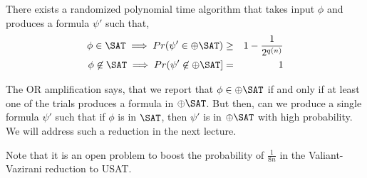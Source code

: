 \begin{lemma}
There exists a randomized polynomial time algorithm that takes input $\phi$ and produces a formula $\psi'$ such that,
\begin{eqnarray*}
\phi \in \SAT \implies Pr(\psi' \in \oplus\SAT) & \geq & 1-\frac{1}{2^{q(n)}} \\
\phi \not\in \SAT \implies Pr (\psi' \not\in \oplus\SAT] & = & 1
\end{eqnarray*}
\end{lemma}

The OR amplification says, that we report that $\phi \in \oplus\SAT$ if and only if at least one of the trials produces a formula in $\oplus\SAT$. But then, can we produce a single formula $\psi'$ such that if $\phi$ is in $\SAT$, then $\psi'$ is in $\oplus\SAT$ with high probability. We will address such a reduction in the next lecture.


Note that it is an open problem to boost the probability of $\frac{1}{8n}$ in the Valiant-Vazirani reduction to USAT.%
